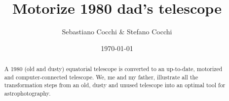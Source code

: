 \documentclass{article}
\title{Motorize 1980 dad's telescope}
\author{Sebastiano Cocchi \& Stefano Cocchi}
\date{\today}
\begin{document}
    
    \maketitle

    \begin{abstract}
        A 1980 (old and dusty) equatorial telescope is converted to an up-to-date, motorized and computer-connected telescope.
        We, me and my father, illustrate all the transformation steps from an old, dusty and unused telescope into an optimal tool for astrophotography.
    \end{abstract}

    \tableofcontents

\end{document}
